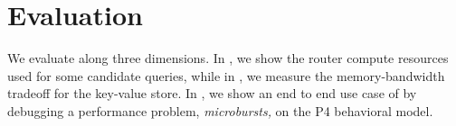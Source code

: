 \section{Evaluation}
\label{sec:eval}



We evaluate \TheSystem along three dimensions. In , we show
the router compute resources used for some candidate \TheSystem queries, while
in , we measure the memory-bandwidth tradeoff for the
key-value store. In , we show an end to end use case of
\TheSystem by debugging a performance problem, {\em microbursts,} on the P4
behavioral model.








